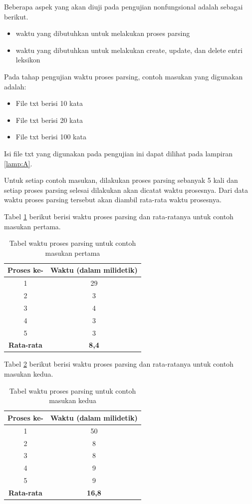 Beberapa aspek yang akan diuji pada pengujian nonfungsional adalah sebagai berikut.

\begin{itemize}
	\item waktu yang dibutuhkan untuk melakukan proses parsing
	\item waktu yang dibutuhkan untuk melakukan create, update, dan delete entri leksikon
\end{itemize}

Pada tahap pengujian waktu proses parsing, contoh masukan yang digunakan adalah:

\begin{itemize}
	\item File txt berisi 10 kata
	\item File txt berisi 20 kata
	\item File txt berisi 100 kata
\end{itemize}

Isi file txt yang digunakan pada pengujian ini dapat dilihat pada lampiran \ref{lamp:A}.

Untuk setiap contoh masukan, dilakukan proses parsing sebanyak 5 kali dan setiap proses parsing selesai dilakukan akan dicatat waktu prosesnya. Dari data waktu proses parsing tersebut akan diambil rata-rata waktu prosesnya.

Tabel \ref{tabel-waktu-parsing-pertama} berikut berisi waktu proses parsing dan rata-ratanya untuk contoh masukan pertama.

\begin{table}[H]
\centering
\begin{tabular}{|c|c|}
\hline
\textbf{Proses ke-} & \textbf{Waktu} (dalam milidetik) \\
\hline
1&29\\
2&3\\
3&4\\
4&3\\
5&3\\
\hline
\textbf{Rata-rata} & \textbf{8,4}\\
\hline
\end{tabular}
\caption{Tabel waktu proses parsing untuk contoh masukan pertama} 
\label{tabel-waktu-parsing-pertama}
\end{table}

Tabel \ref{tabel-waktu-parsing-kedua} berikut berisi waktu proses parsing dan rata-ratanya untuk contoh masukan kedua.

\begin{table}[H]
\centering
\begin{tabular}{|c|c|}
\hline
\textbf{Proses ke-} & \textbf{Waktu} (dalam milidetik) \\
\hline
1&50\\
2&8\\
3&8\\
4&9\\
5&9\\
\hline
\textbf{Rata-rata} & \textbf{16,8}\\
\hline
\end{tabular}
\caption{Tabel waktu proses parsing untuk contoh masukan kedua} 
\label{tabel-waktu-parsing-kedua}
\end{table}

